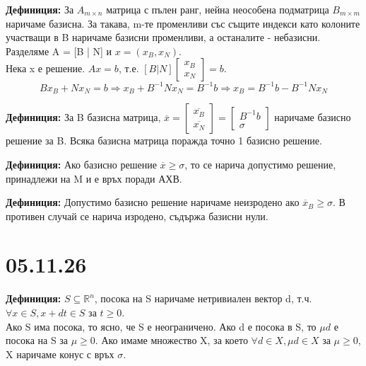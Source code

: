 \documentclass[12pt, a4paper]{article}
\def\D{\mathbb}
\begin{document}
\textbf{Дефиниция:} За $A_{m\times n}$ матрица с пълен ранг, нейна неособена подматрица $B_{m\times m}$ наричаме базисна. За такава, m-те променливи със същите индекси като колоните участващи в B наричаме базисни променливи, а останалите - небазисни. Разделяме A = [B | N] и $x=(x_B, x_N)$.\\

Нека x е решение. $Ax=b$, т.е. $[B|N]\begin{bmatrix}x_B\\x_N\end{bmatrix}=b$. \\
\[Bx_B+Nx_N=b \Rightarrow x_B + B^{-1}Nx_N=B^{-1}b \Rightarrow x_B=B^{-1}b-B^{-1}Nx_N\]

\textbf{Дефиниция:} За B базисна матрица, $\overline{x} = 
\begin{bmatrix}\overline{x_B}\\\overline{x_N}\end{bmatrix}=
\begin{bmatrix}B^{-1}b\\\sigma\end{bmatrix}$ наричаме базисно решение за B. Всяка базисна матрица поражда точно 1 базисно решение.

\textbf{Дефиниция:} Ако базисно решение $\overline{x}\geq\sigma$, то се нарича допустимо решение, принадлежи на M и е връх поради АХВ. 

\textbf{Дефиниция:} Допустимо базисно решение наричаме неизродено ако $\overline{x}_B \geq \sigma$. В противен случай се нарича изродено, съдържа базисни нули.\\

{\centering\section*{05.11.26}}

\textbf{Дефиниция:} $S\subseteq \D{R}^n$, посока на S наричаме нетривиален вектор d, т.ч. $\forall x \in S, x+dt\in S$ за $t\geq0$.\\
Ако S има посока, то ясно, че S е неограничено. Ако d е посока в S, то $\mu d$ е посока на S за $\mu\geq0$. Ако имаме множество X, за което $\forall d \in X, \mu d\in X$ за $\mu\geq0$, X наричаме конус с връх $\sigma$.\\
\end{document}
